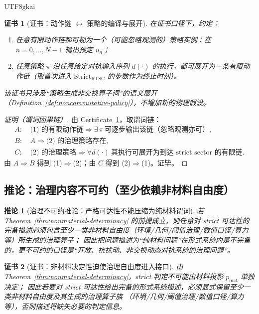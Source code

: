 \documentclass[12pt]{article}
\newtheorem{corollary}{推论}[section]
\newtheorem{certificate}{证书}[section]
\begin{document}
\begin{CJK*}{UTF8}{gkai}
\begin{certificate}[证书：动作链 $\leftrightarrow$ 策略的编译与展开]
\label{cert:policy-compilation}
在证书口径下，约定：
\begin{enumerate}
  \item 任意有限动作链都可视为一个（可能忽略观测的）策略实例：在 $n=0,\dots,N-1$ 输出预定 $u_n$；
  \item 任意策略 $\pi$ 沿任意给定对抗输入序列 $d(\cdot)$ 的执行，都可展开为一条有限动作链（取首次进入 $\mathrm{Strict}_{\mathrm{RTSC}}$ 的步数作为终止时刻）。
\end{enumerate}
该证书只涉及“策略生成非交换算子词”的语义展开（Definition~\ref{def:noncommutative-policy}），不增加新的物理假设。
\end{certificate}

\begin{proof}[证明（谓词因果链）]
由 Certificate~\ref{cert:policy-compilation}，取谓词链：
\[
\begin{aligned}
A:&\ \text{(1) 的有限动作链}\Rightarrow \exists\,\pi\ \text{可逐步输出该链（忽略观测亦可）},\\
B:&\ A\Rightarrow \text{(2) 的治理策略存在},\\
C:&\ \text{(2) 的治理策略}\Rightarrow \forall d(\cdot)\ \text{其执行可展开为到达 strict sector 的有限链}.
\end{aligned}
\]
由 $A\Rightarrow B$ 得到 (1)$\Rightarrow$(2)；由 $C$ 得到 (2)$\Rightarrow$(1)。证毕。
\end{proof}

\subsection{推论：治理内容不可约（至少依赖非材料自由度）}

\begin{corollary}[治理不可约推论：严格可达性不能压缩为纯材料谓词]
\label{cor:governance-irreducible}
若 Theorem~\ref{thm:nonmaterial-determinacy} 的前提成立，则任意对 strict 可达性的完备描述必须包含至少一类非材料自由度（环境/几何/阈值治理/数值口径/算力等）所生成的治理算子；
因此把问题描述为“纯材料问题”在形式系统内是不完备的，更不可约的口径是“开放、抗扰动、非交换动态对抗系统的治理问题”。
\end{corollary}

\begin{certificate}[证书：非材料决定性迫使治理自由度进入接口]
\label{cert:governance-irreducible}
由 Theorem~\ref{thm:nonmaterial-determinacy}，strict 判定不可能由材料投影 $p_{\mathrm{mat}}$ 单独决定；
因此若要对 strict 可达性给出\emph{完备}的形式系统描述，必须显式保留至少一类非材料自由度及其生成的治理算子族
（环境/几何/阈值治理/数值口径/算力等），否则描述将缺失必要的判定信息。
\end{certificate}


\end{CJK*}
\end{document}
